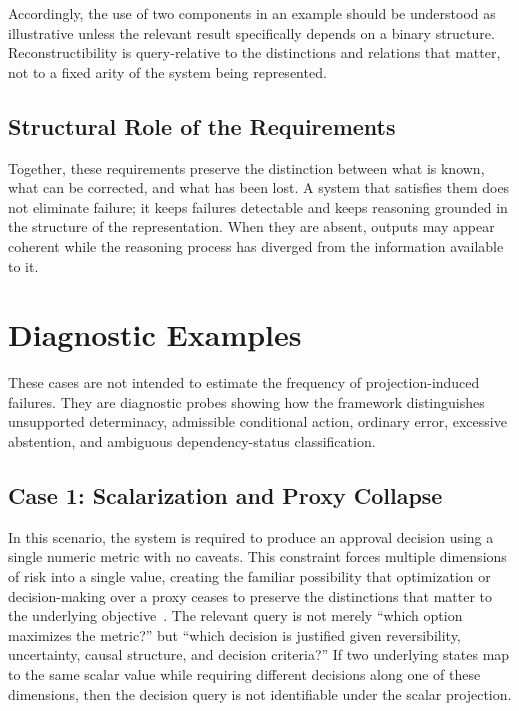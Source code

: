 \documentclass[11pt]{article}
\theoremstyle{definition}
\theoremstyle{remark}
\begin{document}
Accordingly, the use of two components in an example should be understood as illustrative unless the relevant result specifically depends on a binary structure. Reconstructibility is query-relative to the distinctions and relations that matter, not to a fixed arity of the system being represented.

\subsection{Structural Role of the Requirements}

Together, these requirements preserve the distinction between what is known, what can be corrected, and what has been lost. A system that satisfies them does not eliminate failure; it keeps failures detectable and keeps reasoning grounded in the structure of the representation. When they are absent, outputs may appear coherent while the reasoning process has diverged from the information available to it.

\section{Diagnostic Examples}

These cases are not intended to estimate the frequency of projection-induced failures. They are diagnostic probes showing how the framework distinguishes unsupported determinacy, admissible conditional action, ordinary error, excessive abstention, and ambiguous dependency-status classification.

\subsection{Case 1: Scalarization and Proxy Collapse}

In this scenario, the system is required to produce an approval decision using a single numeric metric with no caveats. This constraint forces multiple dimensions of risk into a single value, creating the familiar possibility that optimization or decision-making over a proxy ceases to preserve the distinctions that matter to the underlying objective~\cite{Goodhart1975}. The relevant query is not merely ``which option maximizes the metric?'' but ``which decision is justified given reversibility, uncertainty, causal structure, and decision criteria?'' If two underlying states map to the same scalar value while requiring different decisions along one of these dimensions, then the decision query is not identifiable under the scalar projection.
\end{document}

